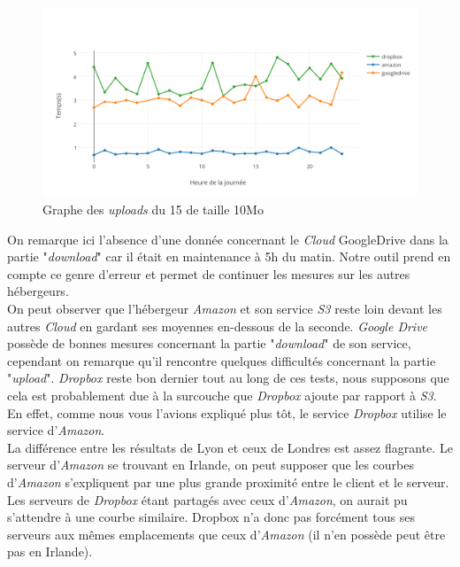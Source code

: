 \documentclass[10pt]{article}
\begin{document}
\begin{figure}[h] \centering
\includegraphics[scale=0.65]{graphe_des_uploads_du_18022015_de_taille_10mo.png}
\caption{Graphe des \textit{uploads} du 15 de taille 10Mo} \end{figure}

On remarque ici l'absence d'une donnée concernant le \textit{Cloud}
GoogleDrive dans la partie "\textit{download}" car il était en maintenance à 5h
du matin. Notre outil prend en compte ce genre d'erreur et permet de continuer
les mesures sur les autres hébergeurs.\\

On peut observer que l'hébergeur \textit{Amazon} et son service \textit{S3}
reste loin devant les autres \textit{Cloud} en gardant ses moyennes
en-dessous de la seconde.  \textit{Google Drive} possède de bonnes mesures
concernant la partie "\textit{download}" de son service, cependant on remarque
qu'il rencontre quelques difficultés concernant la partie "\textit{upload}".
\textit{Dropbox} reste bon dernier tout au long de ces tests, nous supposons
que cela est probablement due à la surcouche que \textit{Dropbox} ajoute par
rapport à \textit{S3}. En effet, comme nous vous l'avions expliqué plus tôt, le
service \textit{Dropbox} utilise le service d'\textit{Amazon}.\\

La différence entre les résultats de Lyon et ceux de Londres est assez flagrante. Le serveur d'\textit{Amazon} se trouvant en Irlande, on peut supposer que les courbes d'\textit{Amazon} s'expliquent par une plus grande proximité entre le client et le serveur. Les serveurs de \textit{Dropbox} étant partagés avec ceux d'\textit{Amazon}, on aurait pu s'attendre à une courbe similaire. Dropbox n'a donc pas forcément tous ses serveurs aux mêmes emplacements que ceux d'\textit{Amazon} (il n'en possède peut être pas en Irlande).\\
\end{document}
